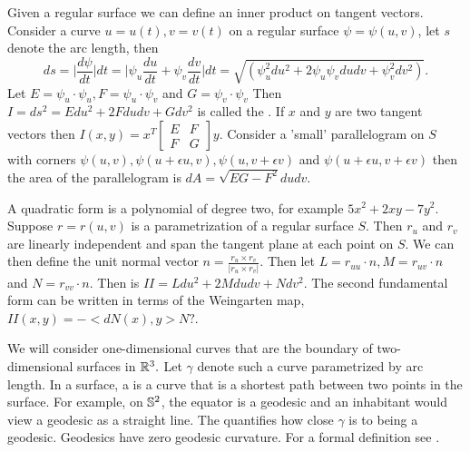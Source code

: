 Given a regular surface we can define an inner product on tangent vectors.
Consider a curve $u=u(t), v=v(t)$ on a regular surface $\psi=\psi(u,v)$, let
$s$ denote the arc length, then 
$$ds=\bigg | \frac{d\psi}{dt}\bigg | dt = \bigg | \psi_u\frac{du}{dt}+\psi_v\frac{dv}{dt}\bigg |dt
=\sqrt{(\psi_u^2 du^2+2\psi_u\psi_v du dv + \psi_v^2dv^2)}.$$
Let $E=\psi_u\cdot \psi_u, F=\psi_u\cdot \psi_v$ and  $G=\psi_v\cdot \psi_v$
Then $I=ds^2=Edu^2+2Fdudv +Gdv^2$ is called the .
If $x$ and $y$ are two tangent vectors
then $I(x,y)=x^T\begin{bmatrix}
E & F \\
F & G 
\end{bmatrix}y.$
Consider a 'small' parallelogram on $S$ with corners $\psi(u,v),\psi(u+\epsilon u, v), \psi(u,v+\epsilon v)$ 
and $\psi(u+\epsilon u, v+\epsilon v)$ then the area of the parallelogram is
$dA=\sqrt{EG-F^2}dudv.$

A quadratic form is a polynomial of degree two, for example $5x^2+2xy-7y^2$.
Suppose $r=r(u,v)$ is a parametrization of a regular surface $S$.
Then $r_u$ and $r_v$ are linearly independent and span the tangent plane at each point
on $S$. We can then define the unit normal vector $n=\frac{r_u\times r_v}{|r_u\times r_v|}$.
Then let $L=r_{uu}\cdot n, M=r_{uv}\cdot n$ and $N=r_{vv}\cdot n$.
Then  is $II=Ldu^2+2Mdudv+Ndv^2$.
The second fundamental form can be written in terms of the Weingarten map,
$II(x,y)=-<dN(x),y>N?$.


We will consider one-dimensional curves that are the boundary of two-dimensional
surfaces in $\mathbb{R}^3.$ Let $\gamma$ denote such a curve parametrized by arc length.
In a surface, a  is a curve that is a shortest path
between two points in the surface. 
For example, on $\mathbb{S}^2$, the equator is a geodesic
and an inhabitant would view a geodesic as a straight line. 
The  quantifies how close $\gamma$ is to being a geodesic.
Geodesics have zero geodesic curvature. 
For a formal definition see \cite{doc76}.



